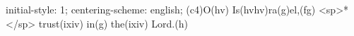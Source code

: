 initial-style: 1;
centering-scheme: english;
(c4)O(hv) Is(hvhv)ra(g)el,(fg) <sp>*</sp> trust(ixiv) in(g) the(ixiv) Lord.(h)
